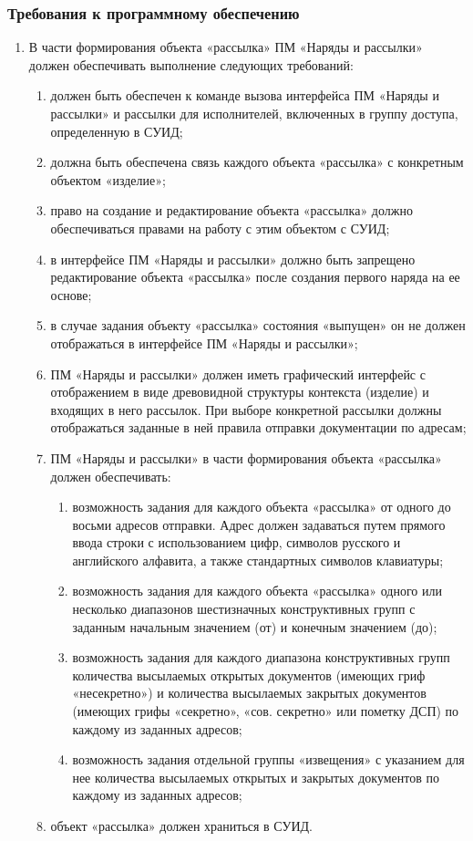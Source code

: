 \documentclass[oneside, final, 12pt]{article}
\renewcommand{\labelenumi}{\arabic{section}.\arabic{subsection}.\arabic{enumi}}
\begin{document}
\subsubsection{Требования к программному обеспечению}
\begin{enumerate}
\renewcommand{\labelenumi}{\arabic{section}.\arabic{subsection}.\arabic{subsubsection}.\arabic{enumi}}
    \item В части формирования объекта «рассылка» ПМ «Наряды и рассылки» должен обеспечивать выполнение следующих требований:
    \begin{enumerate}
        \item должен быть обеспечен к команде вызова интерфейса ПМ «Наряды и рассылки» и рассылки для исполнителей, включенных в группу доступа, определенную в СУИД;
        \item должна быть обеспечена связь каждого объекта «рассылка» с конкретным объектом «изделие»;
        \item право на создание и редактирование объекта «рассылка» должно обеспечиваться правами на работу с этим объектом с СУИД;
        \item в интерфейсе ПМ «Наряды и рассылки» должно быть запрещено редактирование объекта «рассылка» после создания первого наряда на ее основе;
        \item в случае задания объекту «рассылка» состояния «выпущен» он не должен отображаться в интерфейсе ПМ «Наряды и рассылки»;
        \item ПМ «Наряды и рассылки» должен иметь графический интерфейс с отображением в виде древовидной структуры контекста (изделие) и входящих в него рассылок. При выборе конкретной рассылки должны отображаться заданные в ней правила отправки документации по адресам;
        \item ПМ «Наряды и рассылки» в части формирования объекта «рассылка» должен обеспечивать:
        \begin{enumerate}
            \item возможность задания для каждого объекта «рассылка» от одного до восьми адресов отправки. Адрес должен задаваться путем прямого ввода строки с использованием цифр, символов русского и английского алфавита, а также стандартных символов клавиатуры;
            \item возможность задания для каждого объекта «рассылка» одного или несколько диапазонов шестизначных конструктивных групп с заданным начальным значением (от) и конечным значением (до);
            \item возможность задания для каждого диапазона конструктивных групп количества высылаемых открытых документов (имеющих гриф «несекретно») и количества высылаемых закрытых документов (имеющих грифы «секретно», «сов. секретно» или пометку ДСП) по каждому из заданных адресов;
            \item возможность задания отдельной группы «извещения» с указанием для нее количества высылаемых открытых и закрытых документов по каждому из заданных адресов;
        \end{enumerate}
        \item объект «рассылка» должен храниться в СУИД. 
    \end{enumerate}
\end{enumerate}
\end{document}
